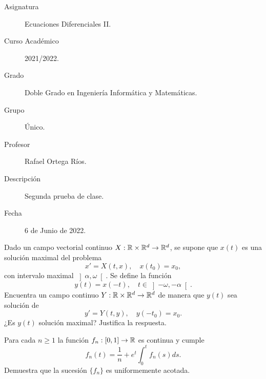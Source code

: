 \documentclass[12pt]{article}
\begin{document}

    
    

    \begin{description}
        \item[Asignatura] Ecuaciones Diferenciales II.
        \item[Curso Académico] 2021/2022.
        \item[Grado] Doble Grado en Ingeniería Informática y Matemáticas.
        \item[Grupo] Único.
        \item[Profesor] Rafael Ortega Ríos.
        \item[Descripción] Segunda prueba de clase.
        \item[Fecha] 6 de Junio de 2022.
    
    \end{description}
    \newpage


    
    \begin{ejercicio}
        Dado un campo vectorial continuo $X : \mathbb{R} \times \mathbb{R}^d \to \mathbb{R}^d$, se supone que $x(t)$ es una solución maximal del problema
        \[
            x' = X(t,x), \quad x(t_0) = x_0,
        \]
        con intervalo maximal $\left]\alpha, \omega\right[$. Se define la función
        \[
            y(t) = x(-t), \quad t \in \left]-\omega, -\alpha\right[.
        \]
        Encuentra un campo continuo $Y : \mathbb{R} \times \mathbb{R}^d \to \mathbb{R}^d$ de manera que $y(t)$ sea solución de
        \[
            y' = Y(t,y), \quad y(-t_0) = x_0.
        \]
        ¿Es $y(t)$ solución maximal? Justifica la respuesta.
    \end{ejercicio}

    \begin{ejercicio}
        Para cada $n \geq 1$ la función $f_n : \left[0, 1\right] \to \mathbb{R}$ es continua y cumple
        \[
            f_n(t) = \frac{1}{n} + e^t \int_0^t f_n(s)ds.
        \]
        Demuestra que la sucesión $\{f_n\}$ es uniformemente acotada.
    \end{ejercicio}
\end{document}
